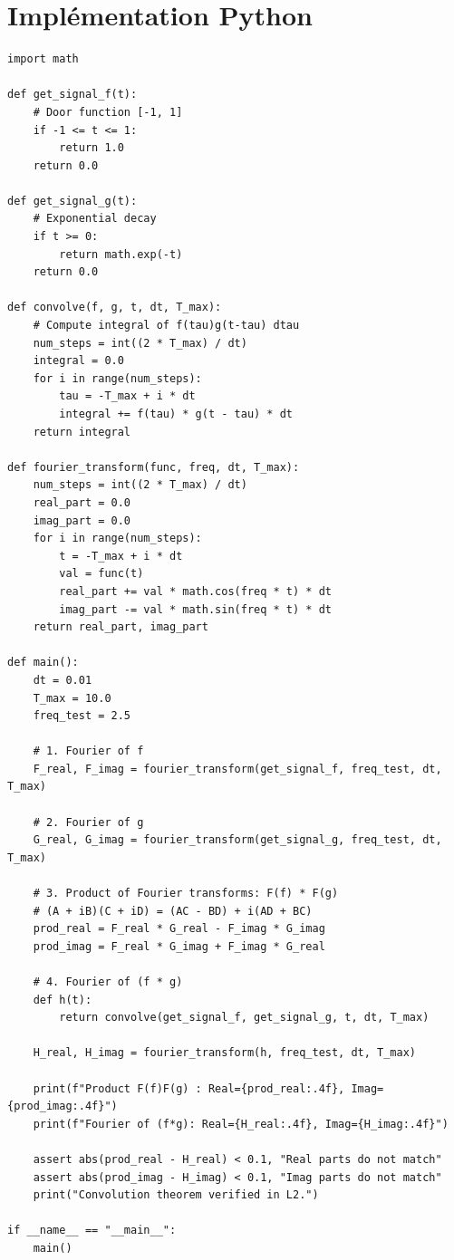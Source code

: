 \documentclass[11pt,a4paper]{article}
\begin{document}
\section{Implémentation Python}

\begin{lstlisting}
import math

def get_signal_f(t):
    # Door function [-1, 1]
    if -1 <= t <= 1:
        return 1.0
    return 0.0

def get_signal_g(t):
    # Exponential decay
    if t >= 0:
        return math.exp(-t)
    return 0.0

def convolve(f, g, t, dt, T_max):
    # Compute integral of f(tau)g(t-tau) dtau
    num_steps = int((2 * T_max) / dt)
    integral = 0.0
    for i in range(num_steps):
        tau = -T_max + i * dt
        integral += f(tau) * g(t - tau) * dt
    return integral

def fourier_transform(func, freq, dt, T_max):
    num_steps = int((2 * T_max) / dt)
    real_part = 0.0
    imag_part = 0.0
    for i in range(num_steps):
        t = -T_max + i * dt
        val = func(t)
        real_part += val * math.cos(freq * t) * dt
        imag_part -= val * math.sin(freq * t) * dt
    return real_part, imag_part

def main():
    dt = 0.01
    T_max = 10.0
    freq_test = 2.5

    # 1. Fourier of f
    F_real, F_imag = fourier_transform(get_signal_f, freq_test, dt, T_max)

    # 2. Fourier of g
    G_real, G_imag = fourier_transform(get_signal_g, freq_test, dt, T_max)

    # 3. Product of Fourier transforms: F(f) * F(g)
    # (A + iB)(C + iD) = (AC - BD) + i(AD + BC)
    prod_real = F_real * G_real - F_imag * G_imag
    prod_imag = F_real * G_imag + F_imag * G_real

    # 4. Fourier of (f * g)
    def h(t):
        return convolve(get_signal_f, get_signal_g, t, dt, T_max)

    H_real, H_imag = fourier_transform(h, freq_test, dt, T_max)

    print(f"Product F(f)F(g) : Real={prod_real:.4f}, Imag={prod_imag:.4f}")
    print(f"Fourier of (f*g): Real={H_real:.4f}, Imag={H_imag:.4f}")

    assert abs(prod_real - H_real) < 0.1, "Real parts do not match"
    assert abs(prod_imag - H_imag) < 0.1, "Imag parts do not match"
    print("Convolution theorem verified in L2.")

if __name__ == "__main__":
    main()
\end{lstlisting}
\end{document}
